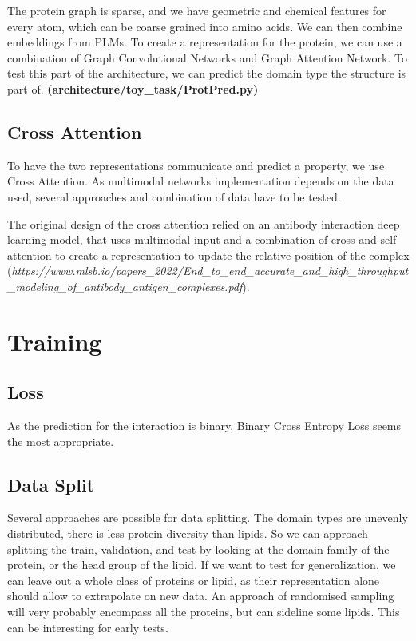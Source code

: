 \documentclass{pssbmac}
\begin{document}
The protein graph is sparse, and we have geometric and chemical features for every atom, which can be coarse grained into amino acids. We can then combine embeddings from PLMs. To create a representation for the protein, we can use a combination of Graph Convolutional Networks and Graph Attention Network. To test this part of the architecture, we can predict the domain type the structure is part of. \textbf{(architecture/toy\_task/ProtPred.py)}

\subsection{Cross Attention}

To have the two representations communicate and predict a property, we use Cross Attention. As multimodal networks implementation depends on the data used, several approaches and combination of data have to be tested.

The original design of the cross attention relied on an antibody interaction deep learning model, that uses multimodal input and a combination of cross and self attention to create a representation to update the relative position of the complex (\tiny\textit{https://www.mlsb.io/papers\_2022/End\_to\_end\_accurate\_and\_high\_throughput\_modeling\_of\_antibody\_antigen\_complexes.pdf}).
\normalsize

\section{Training}

\subsection{Loss}

As the prediction for the interaction is binary, Binary Cross Entropy Loss seems the most appropriate. 

\subsection{Data Split}

Several approaches are possible for data splitting. The domain types are unevenly distributed, there is less protein diversity than lipids. So we can approach splitting the train, validation, and test by looking at the domain family of the protein, or the head group of the lipid. If we want to test for generalization, we can leave out a whole class of proteins or lipid, as their representation alone should allow to extrapolate on new data. An approach of randomised sampling will very probably encompass all the proteins, but can sideline some lipids. This can be interesting for early tests.
\end{document}
